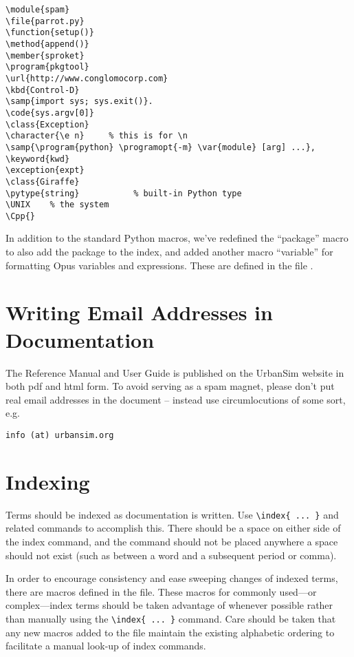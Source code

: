 \begin{verbatim}
\module{spam}
\file{parrot.py}
\function{setup()}
\method{append()}
\member{sproket}
\program{pkgtool}
\url{http://www.conglomocorp.com}
\kbd{Control-D}
\samp{import sys; sys.exit()}.
\code{sys.argv[0]}
\class{Exception}
\character{\e n}     % this is for \n
\samp{\program{python} \programopt{-m} \var{module} [arg] ...},
\keyword{kwd}
\exception{expt}
\class{Giraffe}
\pytype{string}           % built-in Python type
\UNIX    % the system
\Cpp{}
\end{verbatim}

In addition to the standard Python macros, we've redefined the ``package'' macro 
to also add the package to the index, and added another macro ``variable'' for 
formatting Opus variables and expressions.  These are defined in the file 
.


\section{Writing Email Addresses in Documentation}

The Reference Manual and User Guide is published on the UrbanSim website in
both pdf and html form.  To avoid serving as a spam magnet, please don't put
real email addresses in the document -- instead use circumlocutions of
some sort, e.g.\

\begin{verbatim}
info (at) urbansim.org
\end{verbatim}

\section{Indexing}

Terms should be indexed as documentation is written. Use \verb|\index{ ... }| and
related commands to accomplish this. There should be a space on either side of the
index command, and the command should not be placed anywhere a space should not exist
(such as between a word and a subsequent period or comma).

In order to encourage consistency and ease sweeping changes of indexed terms, there
are macros defined in the  file. These macros for commonly
used---or complex---index terms should be taken advantage of whenever possible
rather than manually using the \verb|\index{ ... }| command. Care should be taken
that any new macros added to the file maintain the existing alphabetic ordering
to facilitate a manual look-up of index commands.

